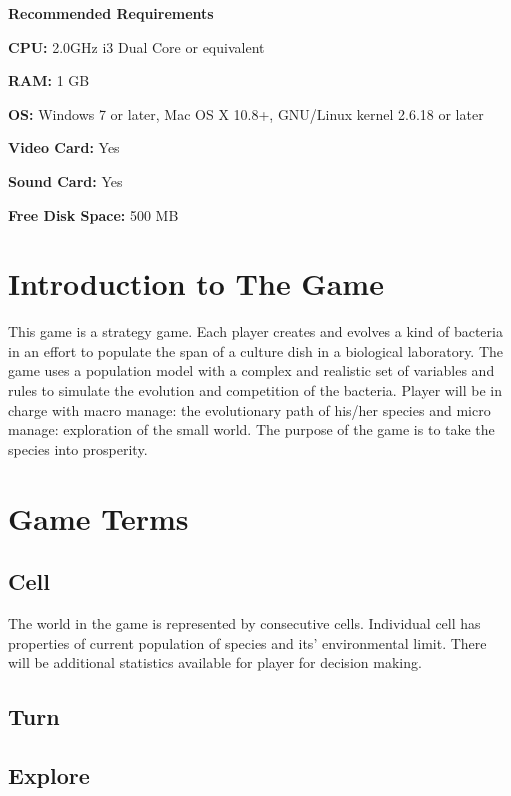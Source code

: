 \documentclass[12pt,a4paper,twoside]{scrartcl}
\begin{document}
\large
\textbf{Recommended Requirements}
\begin{list}{}{}
	\item \textbf{CPU:} 2.0GHz i3 Dual Core or equivalent
	\item \textbf{RAM:} 1 GB
	\item \textbf{OS:} Windows 7 or later, Mac OS X 10.8+, GNU/Linux kernel 2.6.18 or later
	\item \textbf{Video Card:} Yes
	\item \textbf{Sound Card:} Yes
	\item \textbf{Free Disk Space:} 500 MB
\end{list}
\clearpage
\tableofcontents
\clearpage

\section{Introduction to The Game}

This game is a strategy game. Each player creates and evolves a kind of bacteria in an effort to populate the span of a culture dish in a biological laboratory. The game uses a population model with a complex and realistic set of variables and rules to simulate the evolution and competition of the bacteria. Player will be in charge with macro manage: the evolutionary path of his/her species and micro manage: exploration of the small world. The purpose of the game is to take the species into prosperity.

\section{Game Terms}

\subsection{Cell} 

The world in the game is represented by consecutive cells. Individual cell has properties of current population of species and its' environmental limit. There will be additional statistics available for player for decision making.

\subsection{Turn}

\subsection{Explore}
\end{document}
